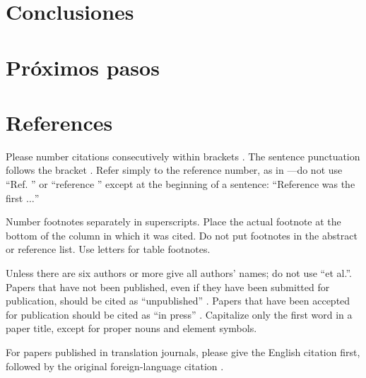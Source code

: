 \documentclass[conference]{IEEEtran}
\begin{document}
\section{Conclusiones}
\section{Próximos pasos}

\section*{References}

Please number citations consecutively within brackets \cite{b1}. The 
sentence punctuation follows the bracket \cite{b2}. Refer simply to the reference 
number, as in \cite{b3}---do not use ``Ref. \cite{b3}'' or ``reference \cite{b3}'' except at 
the beginning of a sentence: ``Reference \cite{b3} was the first $\ldots$''

Number footnotes separately in superscripts. Place the actual footnote at 
the bottom of the column in which it was cited. Do not put footnotes in the 
abstract or reference list. Use letters for table footnotes.

Unless there are six authors or more give all authors' names; do not use 
``et al.''. Papers that have not been published, even if they have been 
submitted for publication, should be cited as ``unpublished'' \cite{b4}. Papers 
that have been accepted for publication should be cited as ``in press'' \cite{b5}. 
Capitalize only the first word in a paper title, except for proper nouns and 
element symbols.

For papers published in translation journals, please give the English 
citation first, followed by the original foreign-language citation \cite{b6}.
\end{document}
